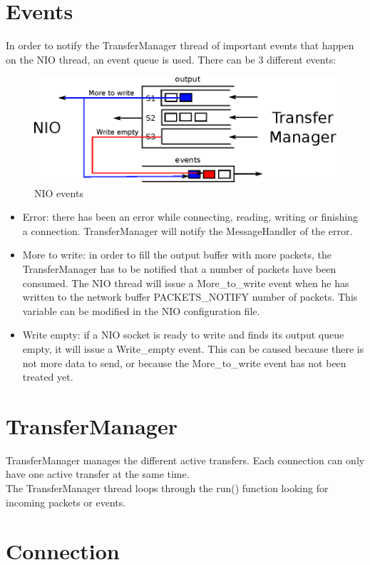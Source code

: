 \documentclass[11pt]{article}
\begin{document}
\section{Events}
	In order to notify the TransferManager thread of important events that happen on the NIO thread, an event queue is used. There can be 3 different events:
	\begin{figure}[H]
	\centering
	\includegraphics[width=120mm]{img/drawing7.eps}
	\caption[NIO events]{NIO events}
	\label{drawing7}
	\end{figure}
	\begin{itemize}
		\item Error: there has been an error while connecting, reading, writing or finishing a connection. TransferManager will notify the MessageHandler of the error.
		\item More to write: in order to fill the output buffer with more packets, the TransferManager has to be notified that a number of packets have been consumed. The NIO thread will issue a More\_to\_write event when he has written to the network buffer PACKETS\_NOTIFY number of packets. This variable can be modified in the NIO configuration file.
		\item Write empty: if a NIO socket is ready to write and finds its output queue empty, it will issue a Write\_empty event. This can be caused because there is not more data to send, or because the More\_to\_write event has not been treated yet.
	\end{itemize}

\section{TransferManager}
	TransferManager manages the different active transfers. Each connection can only have one active transfer at the same time.\\
	The TransferManager thread loops through the run() function looking for incoming packets or events. 
	
\section{Connection}
\end{document}
